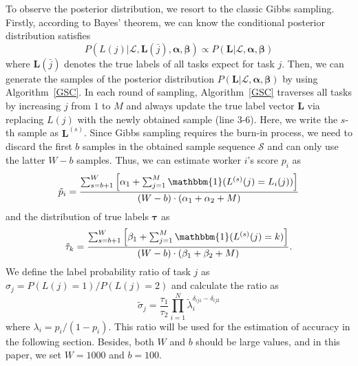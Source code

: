 \documentclass{article}
\begin{document}
To observe the posterior distribution, we resort to the classic Gibbs sampling. Firstly, according to Bayes' theorem, we can know the conditional posterior distribution satisfies
\begin{equation}
P(L(j)|\mathcal{L}, \bm{L}(\bar{j}), \bm{\alpha}, \bm{\beta})\propto P(\bm{L}|\mathcal{L}, \bm{\alpha}, \bm{\beta})
\end{equation} 
where $\bm{L}(\bar{j})$ denotes the true labels of all tasks expect for task $j$.
Then, we can generate the samples of the posterior distribution $P(\bm{L}|\mathcal{L}, \bm{\alpha}, \bm{\beta})$ by using Algorithm~\ref{GSC}.
In each round of sampling, Algorithm~\ref{GSC} traverses all tasks by increasing $j$ from $1$ to $M$ and always update the true label vector $\bm{L}$ via replacing $L(j)$ with the newly obtained sample (line 3-6).
Here, we write the $s$-th sample as $\bm{L}^{(s)}$.
Since Gibbs sampling requires the burn-in process, we need to discard the first $b$ samples in the obtained sample sequence $\mathcal{S}$ and can only use the latter $W-b$ samples.
Thus, we can estimate worker $i$'s score $p_i$ as
\begin{equation}
\label{p_infer}
\tilde{p}_{i}=\frac{\sum_{s=b+1}^{W}\left[\alpha_{1}+\sum_{j=1}^{M}\mathbbm{1}(L^{(s)}(j)=L_{i}(j))\right]}{(W-b)\cdot(\alpha_{1}+\alpha_{2}+M)}
\end{equation}
and the distribution of true labels $\bm{\tau}$ as
\begin{equation}
\label{tau_infer}
\tilde{\tau}_{k}=\frac{\sum_{s=b+1}^{W}\left[\beta_{1}+\sum_{j=1}^{M}\mathbbm{1}(L^{(s)}(j)=k)\right]}{(W-b)\cdot(\beta_{1}+\beta_{2}+M)}.
\end{equation}
We define the label probability ratio of task $j$ as $\sigma_j =P(L(j)=1)/P(L(j)=2)$ and calculate the ratio as
\begin{equation}
\label{ProbRatio}
\tilde{\sigma}_j=\frac{\tau_1}{\tau_2}{\prod}_{i=1}^{N}\tilde{\lambda}_i^{\delta_{ij1}-\delta_{ij2}}
\end{equation}
where $\lambda_i = p_i/(1-p_i)$. This ratio will be used for the estimation of accuracy in the following section.
Besides, both $W$ and $b$ should be large values, and in this paper, we set $W=1000$ and $b=100$.
\end{document}
